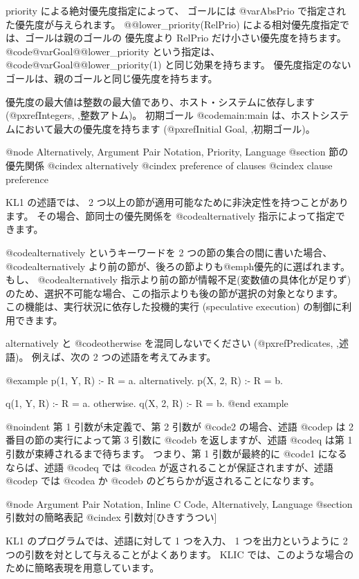 priority による絶対優先度指定によって、
ゴールには @var{AbsPrio} で指定された優先度が与えられます。
@@lower_priority(RelPrio) による相対優先度指定では、ゴールは親のゴールの
優先度より RelPrio だけ小さい優先度を持ちます。
@code{@var{Goal}@@lower_priority} という指定は、 @code{@var{Goal}@@lower_priority(1)} と同じ効果を持ちます。
優先度指定のないゴールは、親のゴールと同じ優先度を持ちます。

優先度の最大値は整数の最大値であり、ホスト・システムに依存します
(@pxref{Integers, ,整数アトム})。
初期ゴール @code{main:main} は、ホストシステムにおいて最大の優先度を持ちます
(@pxref{Initial Goal, ,初期ゴール})。

@node Alternatively, Argument Pair Notation, Priority, Language
@section 節の優先関係
@cindex alternatively
@cindex preference of clauses
@cindex clause preference

KL1 の述語では、 2 つ以上の節が適用可能なために非決定性を持つことがあります。
その場合、節同士の優先関係を @code{alternatively} 指示によって指定できます。

@code{alternatively} というキーワードを 2 つの節の集合の間に書いた場合、 @code{alternatively} より前の節が、後ろの節よりも@emph{優先的に}選ばれます。
もし、 @code{alternatively} 指示より前の節が情報不足(変数値の具体化が足りず)のため、選択不可能な場合、この指示よりも後の節が選択の対象となります。
この機能は、実行状況に依存した投機的実行 (speculative execution) の制御に利用できます。

alternatively と @code{otherwise} を混同しないでください
(@pxref{Predicates, ,述語})。
例えば、次の 2 つの述語を考えてみます。

@example
p(1, Y, R) :- R = a.
alternatively.
p(X, 2, R) :- R = b.

q(1, Y, R) :- R = a.
otherwise.
q(X, 2, R) :- R = b.
@end example

@noindent
第 1 引数が未定義で、第 2 引数が @code{2} の場合、述語 @code{p} は 2 番目の節の実行によって第 3 引数に @code{b} を返しますが、述語 @code{q} は第 1 引数が束縛されるまで待ちます。
つまり、第 1 引数が最終的に @code{1} になるならば、述語 @code{q} では @code{a} が返されることが保証されますが、述語 @code{p} では @code{a} か @code{b} のどちらかが返されることになります。

@node Argument Pair Notation, Inline C Code, Alternatively, Language
@section 引数対の簡略表記
@cindex 引数対[ひきすうつい]

KL1 のプログラムでは、述語に対して 1 つを入力、 1 つを出力というように
 2 つの引数を対として与えることがよくあります。
KLIC では、このような場合のために簡略表現を用意しています。

